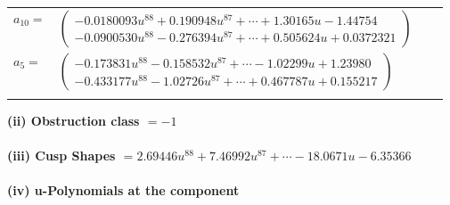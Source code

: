 \documentclass[1p]{elsarticle_modified}
\theoremstyle{definition}
\begin{document}
\begin{tabular}{m{7pt} m{180pt} m{7pt} m{180pt} }
\flushright $a_{10}=$&$\begin{pmatrix}-0.0180093 u^{88}+0.190948 u^{87}+\cdots+1.30165 u-1.44754\\-0.0900530 u^{88}-0.276394 u^{87}+\cdots+0.505624 u+0.0372321\end{pmatrix}$ \\
\flushright $a_{5}=$&$\begin{pmatrix}-0.173831 u^{88}-0.158532 u^{87}+\cdots-1.02299 u+1.23980\\-0.433177 u^{88}-1.02726 u^{87}+\cdots+0.467787 u+0.155217\end{pmatrix}$\\&\end{tabular}
\flushleft \textbf{(ii) Obstruction class $= -1$}\\~\\
\flushleft \textbf{(iii) Cusp Shapes $= 2.69446 u^{88}+7.46992 u^{87}+\cdots-18.0671 u-6.35366$}\\~\\
\newpage\renewcommand{\arraystretch}{1}
\flushleft \textbf{(iv) u-Polynomials at the component}\newline \\
\end{document}
